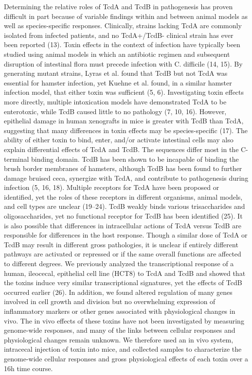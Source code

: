Determining the relative roles of TcdA and TcdB in pathogenesis has proven difficult in part because of variable findings within and between animal models as well as species-specific responses. Clinically, strains lacking TcdA are commonly isolated from infected patients, and no TcdA+/TcdB- clinical strain has ever been reported (13). Toxin effects in the context of infection have typically been studied using animal models in which an antibiotic regimen and subsequent disruption of intestinal flora must precede infection with C. difficile (14, 15). By generating mutant strains, Lyras et al. found that TcdB but not TcdA was essential for hamster infection, yet Kuehne et al. found, in a similar hamster infection model, that either toxin was sufficient (5, 6). Investigating toxin effects more directly, multiple intoxication models have demonstrated TcdA to be enterotoxic, while TcdB caused little to no pathology (7, 10, 16). However, epithelial damage in human xenografts in mice is greater with TcdB than TcdA, suggesting that many differences in toxin effects may be species-specific (17). The ability of either toxin to bind, enter, and/or activate intestinal cells may also explain differential effects of TcdA and TcdB. The sequences differ most in the C-terminal binding domain. TcdB has been shown to be incapable of binding the brush border membranes of hamsters, although TcdB has been found to further damage bruised ceca, synergize with TcdA, and contribute to pathogenesis during infection (5, 16, 18). Multiple receptors for TcdA have been proposed or identified, yet the roles of these receptors in different organisms, animal models, and cell types are unclear (19–24). TcdB weakly binds various trisaccharides and oligosaccharides, yet no functional receptor for TcdB has been identified (25). It is also possible that differences in intracellular actions of TcdA versus TcdB are responsible for differences in the host response. Though a similar dose of TcdA or TcdB may result in different gross pathologies, it is unclear if entirely different pathways are activated or repressed or if the same overall functions are affected to different degrees. We previously analyzed the transcriptional response of a human, ileocecal, epithelial cell line (HCT8) to TcdA and TcdB and showed that the toxins induce very similar transcriptional signatures, yet the effects of TcdB occurred earlier (26). In addition, we found altered regulation of many genes involved in cell growth and division but no overwhelming expression of inflammatory markers or other genes associated with physiological changes in vivo. The in vivo effects of these toxins have not been investigated by measuring genome-wide responses, and many of the links between cellular responses and physiological changes remain unknown. We therefore used an in vivo system, intracecal injection of toxin into mice, and collected samples to characterize the genome-wide cellular responses and gross physiological effects of each toxin over a 16h time course.

